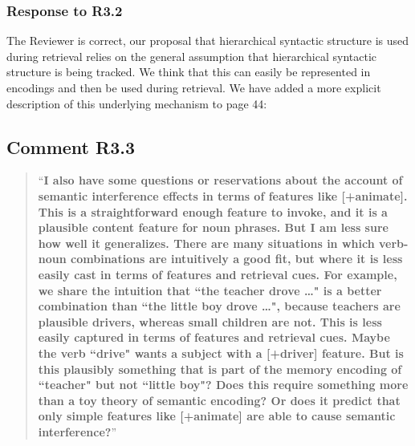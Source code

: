 \documentclass[12pt]{article}
\begin{document}
\subsubsection*{Response to R3.2}
The Reviewer is correct, our proposal that hierarchical syntactic structure is used during retrieval relies on the general assumption that hierarchical syntactic structure is being tracked. We think that this can easily be represented in encodings and then be used during retrieval. We have added a more explicit description of this underlying mechanism to page 44:

\begin{quote}
\end{quote}

\subsection*{Comment R3.3}
\begin{quote}
``\textbf{I also have some questions or reservations about the account of semantic interference effects in terms of features like [+animate]. This is a straightforward enough feature to invoke, and it is a plausible content feature for noun phrases. But I am less sure how well it generalizes. There are many situations in which verb-noun combinations are intuitively a good fit, but where it is less easily cast in terms of features and retrieval cues. For example, we share the intuition that ``the teacher drove …" is a better combination than ``the little boy drove …", because teachers are plausible drivers, whereas small children are not. This is less easily captured in terms of features and retrieval cues. Maybe the verb ``drive" wants a subject with a [+driver] feature. But is this plausibly something that is part of the memory encoding of ``teacher" but not ``little boy"? Does this require something more than a toy theory of semantic encoding? Or does it predict that only simple features like [+animate] are able to cause semantic interference?}''
\end{quote}
\end{document}
